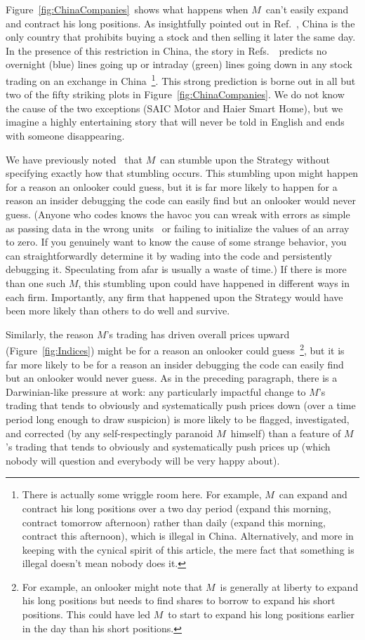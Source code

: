 \documentclass[twocolumn,twoside,prd,floatfix,letterpaper]{revtex4}
\def \FigIndices {Figure~\ref{fig:Indices}}
\def \FigChinaCompanies {Figure~\ref{fig:ChinaCompanies}}
\def \theExplanation {\cite{knuteson2016,knuteson2018,knuteson2019}}
\def \RefsTheExplanation {Refs.~\theExplanation}
\def \M {\ensuremath{M}}
\begin{document}
\FigChinaCompanies\ shows what happens when \M\ can't easily expand and contract his long positions.  As insightfully pointed out in Ref.~\cite{qiao2020overnight}, China is the only country that prohibits buying a stock and then selling it later the same day.  In the presence of this restriction in China, the story in \RefsTheExplanation\ predicts no overnight (blue) lines going up or intraday (green) lines going down in any stock trading on an exchange in China~\footnote{There is actually some wriggle room here.  For example, \M\ can expand and contract his long positions over a two day period (expand this morning, contract tomorrow afternoon) rather than daily (expand this morning, contract this afternoon), which is illegal in China.  Alternatively, and more in keeping with the cynical spirit of this article, the mere fact that something is illegal doesn't mean nobody does it.}.  This strong prediction is borne out in all but two of the fifty striking plots in \FigChinaCompanies.  We do not know the cause of the two exceptions (SAIC Motor and Haier Smart Home), but we imagine a highly entertaining story that will never be told in English and ends with someone disappearing.

We have previously noted~\cite{knuteson2016,knuteson2018} that \M\ can stumble upon the Strategy without specifying exactly how that stumbling occurs.  This stumbling upon might happen for a reason an onlooker could guess, but it is far more likely to happen for a reason an insider debugging the code can easily find but an onlooker would never guess.  (Anyone who codes knows the havoc you can wreak with errors as simple as passing data in the wrong units~\cite{MarsClimateOrbiter} or failing to initialize the values of an array to zero.  If you genuinely want to know the cause of some strange behavior, you can straightforwardly determine it by wading into the code and persistently debugging it.  Speculating from afar is usually a waste of time.)  If there is more than one such \M, this stumbling upon could have happened in different ways in each firm.  Importantly, any firm that happened upon the Strategy would have been more likely than others to do well and survive.

Similarly, the reason \M's trading has driven overall prices upward (\FigIndices) might be for a reason an onlooker could guess~\footnote{For example, an onlooker might note that \M\ is generally at liberty to expand his long positions but needs to find shares to borrow to expand his short positions.  This could have led \M\ to start to expand his long positions earlier in the day than his short positions.}, but it is far more likely to be for a reason an insider debugging the code can easily find but an onlooker would never guess.  As in the preceding paragraph, there is a Darwinian-like pressure at work:  any particularly impactful change to \M's trading that tends to obviously and systematically push prices down (over a time period long enough to draw suspicion) is more likely to be flagged, investigated, and corrected (by any self-respectingly paranoid \M\ himself) than a feature of \M's trading that tends to obviously and systematically push prices up (which nobody will question and everybody will be very happy about).
\end{document}
